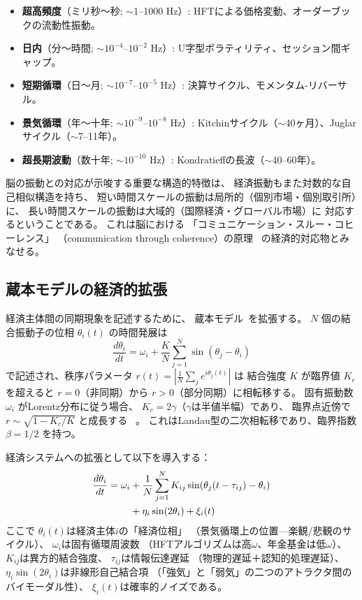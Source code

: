 \documentclass[12pt,twocolumn]{ltjsarticle}
\begin{document}
\begin{itemize}
\item \textbf{超高頻度}（ミリ秒〜秒; $\sim$1--1000 Hz）:
HFTによる価格変動、オーダーブックの流動性振動。

\item \textbf{日内}（分〜時間; $\sim 10^{-4}$--$10^{-2}$ Hz）:
U字型ボラティリティ、セッション間ギャップ。

\item \textbf{短期循環}（日〜月; $\sim 10^{-7}$--$10^{-5}$ Hz）:
決算サイクル、モメンタム-リバーサル。

\item \textbf{景気循環}（年〜十年; $\sim 10^{-9}$--$10^{-8}$ Hz）:
Kitchinサイクル（$\sim$40ヶ月）、Juglarサイクル（$\sim$7--11年）。

\item \textbf{超長期波動}（数十年; $\sim 10^{-10}$ Hz）:
Kondratieffの長波（$\sim$40--60年）。
\end{itemize}

脳の振動との対応が示唆する重要な構造的特徴は、
経済振動もまた対数的な自己相似構造を持ち、
短い時間スケールの振動は局所的（個別市場・個別取引所）に、
長い時間スケールの振動は大域的（国際経済・グローバル市場）に
対応するということである。
これは脳における
「コミュニケーション・スルー・コヒーレンス」
（communication through coherence）の原理~\cite{Fries2005}
の経済的対応物とみなせる。

\subsection{蔵本モデルの経済的拡張}

経済主体間の同期現象を記述するために、
蔵本モデル~\cite{Kuramoto1984}を拡張する。
$N$ 個の結合振動子の位相 $\theta_i(t)$ の時間発展は
\begin{equation}
\frac{d\theta_i}{dt} = \omega_i + \frac{K}{N} \sum_{j=1}^{N}
\sin(\theta_j - \theta_i)
\end{equation}
で記述され、秩序パラメータ
$r(t) = \left| \frac{1}{N} \sum_j e^{i\theta_j(t)} \right|$ は
結合強度 $K$ が臨界値 $K_c$ を超えると
$r = 0$（非同期）から $r > 0$（部分同期）に相転移する。
固有振動数 $\omega_i$ がLorentz分布に従う場合、
$K_c = 2\gamma$（$\gamma$は半値半幅）であり、
臨界点近傍で $r \sim \sqrt{1 - K_c/K}$ と成長する
~\cite{Strogatz2000}。
これはLandau型の二次相転移であり、臨界指数 $\beta = 1/2$ を持つ。

経済システムへの拡張として以下を導入する：
\begin{align}
\frac{d\theta_i}{dt} = \omega_i
&+ \frac{1}{N} \sum_{j=1}^{N} K_{ij}
  \sin(\theta_j(t - \tau_{ij}) - \theta_i) \notag \\
&+ \eta_i \sin(2\theta_i) + \xi_i(t)
\label{eq:kuramoto_econ}
\end{align}
ここで
$\theta_i(t)$は経済主体$i$の「経済位相」
（景気循環上の位置---楽観/悲観のサイクル）、
$\omega_i$は固有循環周波数
（HFTアルゴリズムは高$\omega$、年金基金は低$\omega$）、
$K_{ij}$は異方的結合強度、
$\tau_{ij}$は情報伝達遅延
（物理的遅延＋認知的処理遅延）、
$\eta_i \sin(2\theta_i)$は非線形自己結合項
（「強気」と「弱気」の二つのアトラクタ間のバイモーダル性）、
$\xi_i(t)$は確率的ノイズである。
\end{document}
